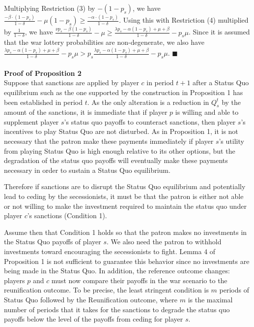 \documentclass[11pt,letterpaper, notitlepage]{article}
\newcommand{\de}{\delta}
\begin{document}
Multiplying Restriction (3) by $-(1-p_s)$, we have $\frac{-\beta \cdot (1-p_s)}{1-\de} -\mu (1-p_s) \geq \frac{-\alpha \cdot (1-p_s)}{1-\de}$. Using this with Restriction (4) multiplied by $\frac{1}{1-\de}$, we have $\frac{\nu p_s - \beta (1-p_s)}{1-\de} -\mu \geq \frac{\lambda p_s - \alpha (1-p_s) + \mu + \beta}{1-\de} -p_s \mu$. Since it is assumed that the war lottery probabilities are non-degenerate, we also have $\frac{\lambda p_s - \alpha (1-p_s) + \mu + \beta}{1-\de} -p_s \mu > p_s \frac{\lambda p_s - \alpha (1-p_s) + \mu + \beta}{1-\de} -p_s \mu$. \hfill $\blacksquare$
\\
\\
{\bf Proof of Proposition 2} \\
Suppose that sanctions are applied by player $c$ in period $t+1$ after a Status Quo equilibrium such as the one supported by the construction in Proposition 1 has been established in period $t$. As the only alteration is a reduction in $Q_s^t$ by the amount of the sanctions, it is immediate that if player $p$ is willing and able to supplement player $s$'s status quo payoffs to counteract sanctions, then player $s$'s incentives to play Status Quo are not disturbed. As in Proposition 1, it is not necessary that the patron make these payments immediately if player $s$'s utility from playing Status Quo is high enough relative to its other options, but the degradation of the status quo payoffs will eventually make these payments necessary in order to sustain a Status Quo equilibrium.

Therefore if sanctions are to disrupt the Status Quo equilibrium and potentially lead to ceding by the secessionists, it must be that the patron is either not able or not willing to make the investment required to maintain the status quo under player $c$'s sanctions (Condition 1).

Assume then that Condition 1 holds so that the patron makes no investments in the Status Quo payoffs of player $s$. We also need the patron to withhold investments toward encouraging the secessionists to fight. Lemma 4 of Proposition 1 is not sufficient to guarantee this behavior since no investments are being made in the Status Quo. In addition, the reference outcome changes: players $p$ and $c$ must now compare their payoffs in the war scenario to the reunification outcome. To be precise, the least stringent condition is $m$ periods of Status Quo followed by the Reunification outcome, where $m$ is the maximal number of periods that it takes for the sanctions to degrade the status quo payoffs below the level of the payoffs from ceding for player $s$. 
\end{document}
